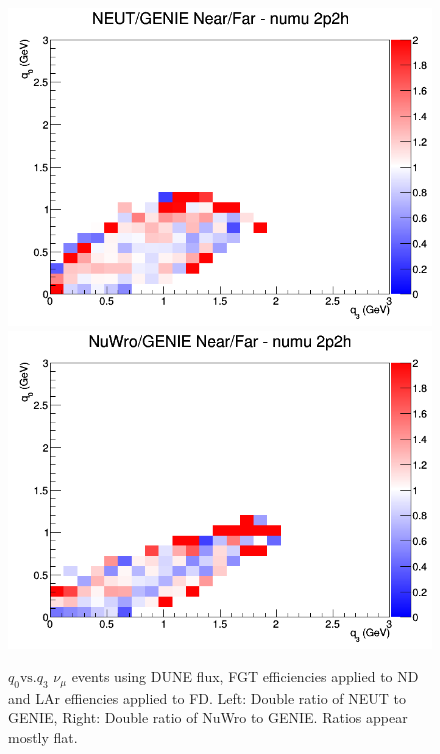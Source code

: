 \documentclass[12pt]{article}
\begin{document}
\begin{figure}[h]
\centering
{}
\includegraphics[width=\linewidth]{eff_q0_q3/FGT/ratios/2p2h_NEUT_GENIE_numu_NF_q3_q0.png}
\endminipage
{}
\includegraphics[width=\linewidth]{eff_q0_q3/FGT/ratios/2p2h_NuWro_GENIE_numu_NF_q3_q0.png}
\endminipage
\caption{$q_0 \textrm{vs.} q_3$ $\nu_{\mu}$ events using DUNE flux, FGT efficiencies applied to ND and LAr effiencies applied to FD. Left: Double ratio of NEUT to GENIE, Right: Double ratio of NuWro to GENIE. Ratios appear mostly flat.}
\label{fig:q0q3_numu_2p2h_FGT_eff}
\end{figure}
\end{document}

